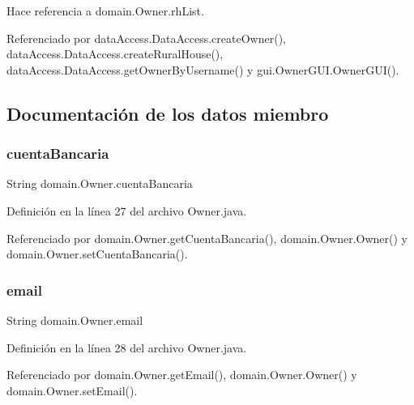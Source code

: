 Hace referencia a domain.\+Owner.\+rh\+List.



Referenciado por data\+Access.\+Data\+Access.\+create\+Owner(), data\+Access.\+Data\+Access.\+create\+Rural\+House(), data\+Access.\+Data\+Access.\+get\+Owner\+By\+Username() y gui.\+Owner\+G\+U\+I.\+Owner\+G\+U\+I().



\subsection{Documentación de los datos miembro}
\mbox{\label{classdomain_1_1_owner_a0c0b7f7134349132b180d90c57181561}} 
\subsubsection{\texorpdfstring{cuentaBancaria}{cuentaBancaria}}
{\footnotesize\ttfamily String domain.\+Owner.\+cuenta\+Bancaria\hspace{0.3cm}{\ttfamily [private]}}



Definición en la línea 27 del archivo Owner.\+java.



Referenciado por domain.\+Owner.\+get\+Cuenta\+Bancaria(), domain.\+Owner.\+Owner() y domain.\+Owner.\+set\+Cuenta\+Bancaria().

\mbox{\label{classdomain_1_1_owner_a37fce65d727c0c7d4fbc7d2c2493148c}} 
\subsubsection{\texorpdfstring{email}{email}}
{\footnotesize\ttfamily String domain.\+Owner.\+email\hspace{0.3cm}{\ttfamily [private]}}



Definición en la línea 28 del archivo Owner.\+java.



Referenciado por domain.\+Owner.\+get\+Email(), domain.\+Owner.\+Owner() y domain.\+Owner.\+set\+Email().


